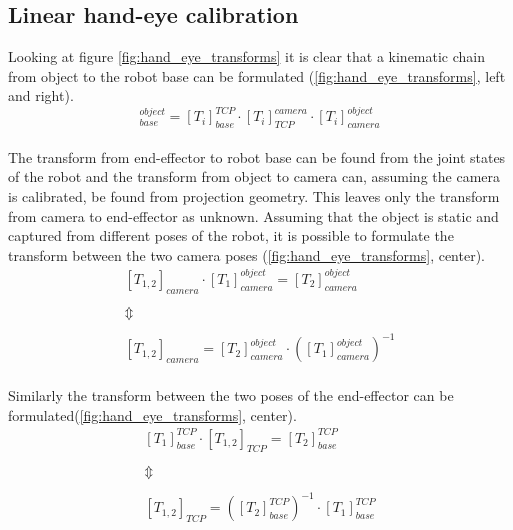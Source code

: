 \subsection{Linear hand-eye calibration}
\noindent Looking at figure \ref{fig:hand_eye_transforms} it is clear that a kinematic chain from object to the robot base can be formulated (\ref{fig:hand_eye_transforms}, left and right).\\

\begin{equation}
	[T_{i}]_{base}^{object} = [T_{i}]_{base}^{TCP} \cdot [T_{i}]_{TCP}^{camera} \cdot [T_{i}]_{camera}^{object}
\end{equation} \\

\noindent The transform from end-effector to robot base can be found from the joint states of the robot and the transform from object to camera can, assuming the camera is calibrated, be found from projection geometry. This leaves only the transform from camera to end-effector as unknown. Assuming that the object is static and captured from different poses of the robot, it is possible to formulate the transform between the two camera poses (\ref{fig:hand_eye_transforms}, center).\\

\begin{equation}\label{eq:object_camera}
\begin{matrix}
[T_{1,2}]_{camera} \cdot [T_{1}]_{camera}^{object} = [T_{2}]_{camera}^{object} \\
\\  
\Updownarrow \\ 
\\ 
[T_{1,2}]_{camera} = [T_{2}]_{camera}^{object} \cdot ([T_{1}]_{camera}^{object})^{-1}
\end{matrix}
\end{equation}\\ 

\noindent Similarly the transform between the two poses of the end-effector can be formulated(\ref{fig:hand_eye_transforms}, center).\\

\begin{equation}
\begin{matrix}
[T_{1}]_{base}^{TCP} \cdot [T_{1,2}]_{TCP} = [T_{2}]_{base}^{TCP} \\ 
\\ 
\Updownarrow \\ 
\\ 
[T_{1,2}]_{TCP} = ([T_{2}]_{base}^{TCP})^{-1} \cdot  [T_{1}]_{base}^{TCP}
\end{matrix}
\end{equation}\\ 

